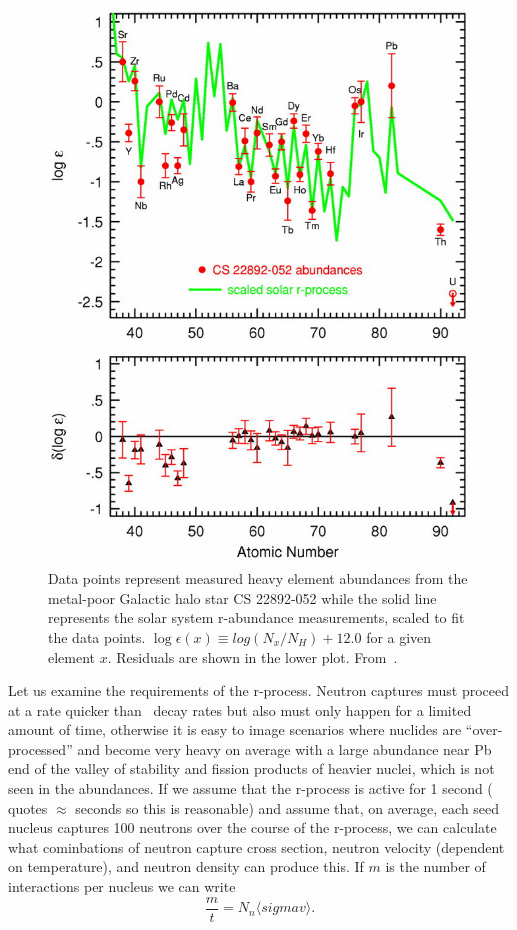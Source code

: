 {\begin{figure}
\includegraphics[width=\linewidth]{pdf/oldstar.png}
\caption{\label{fig:old} Data points represent measured heavy element
abundances from the metal-poor Galactic halo star CS 22892-052 while
the solid line represents the solar system r-abundance measurements,
scaled to fit the data points.  $\log \epsilon (x) \equiv log(N_x/N_H) +
12.0$ for a given element $x$.  Residuals are shown in the lower
plot.  From~\cite{truranetal2002}.}
\end{figure}

Let us examine the requirements of the r-process.  Neutron captures
must proceed at a rate quicker than \bminus\ decay rates but also must
only happen for a limited amount of time, otherwise it is easy to
image scenarios where nuclides are ``over-processed'' and become very
heavy on average with a large abundance near Pb end of the valley of
stability and fission products of heavier nuclei, which is not seen in
the abundances.  If we assume that the r-process is active for 1
second (\citealt{iliadis2008} quotes $\approx$ seconds so this is
reasonable) and assume that, on average, each seed nucleus captures
100 neutrons over the course of the r-process, we can calculate what
cominbations of neutron capture cross section, neutron velocity
(dependent on temperature), and
neutron density can produce this.  If $m$ is the number of
interactions per nucleus we can write
\begin{equation}
\frac{m}{t} = N_n \langle sigma v \rangle.
\end{equation}

}
